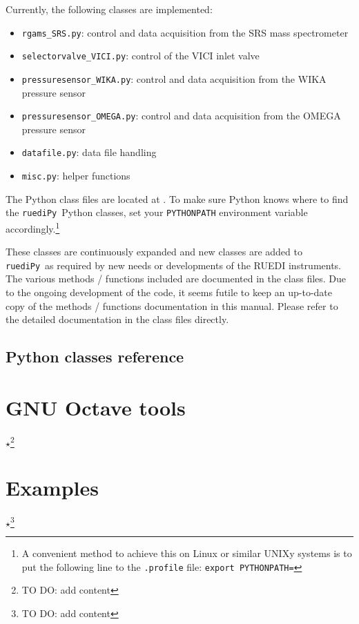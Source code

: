 \documentclass[12pt]{article}   	%
\newcommand{\ruediPy}{\texttt{ruediPy}}
\newcommand{\work}[1]{{\Large\bf\ensuremath{\star}}\footnote{TO DO: #1}}
\begin{document}
Currently, the following classes are implemented:
\begin{itemize}
\item \texttt{rgams\_SRS.py}: control and data acquisition from the SRS mass spectrometer
\item \texttt{selectorvalve\_VICI.py}: control of the VICI inlet valve
\item \texttt{pressuresensor\_WIKA.py}: control and data acquisition from the WIKA pressure sensor
\item \texttt{pressuresensor\_OMEGA.py}: control and data acquisition from the OMEGA pressure sensor
\item \texttt{datafile.py}: data file handling
\item \texttt{misc.py}: helper functions
\end{itemize}


The Python class files are located at . To make sure Python knows where to find the \ruediPy\ Python classes, set your \texttt{PYTHONPATH} environment variable accordingly.\footnote{A convenient method to achieve this on Linux or similar UNIXy systems is to put the following line to the \texttt{.profile} file: 
 \texttt{export PYTHONPATH=}}

These classes are continuously expanded and new classes are added to \ruediPy\ as required by new needs or developments of the RUEDI instruments. The various methods / functions included are documented in the class files. Due to the ongoing development of the code, it seems futile to keep an up-to-date copy of the methods / functions documentation in this manual. Please refer to the detailed documentation in the class files directly.

\subsection{Python classes reference}


\section{GNU Octave tools}
\work{add content}

\section{Examples}
\work{add content}


\end{document}
